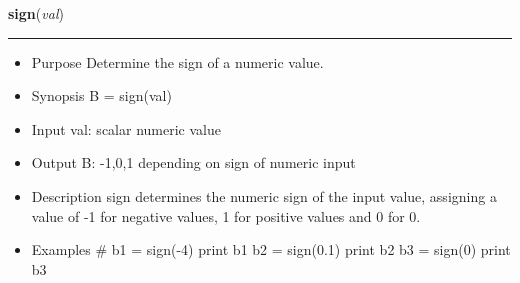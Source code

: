     \begin{boxedminipage}{\textwidth}

    \raggedright \textbf{sign}(\textit{val})

    \vspace{-1.5ex}

    \rule{\textwidth}{0.5\fboxrule}
    \begin{itemize}
    \setlength{\parskip}{0.6ex}
      \item Purpose Determine the sign of a numeric value.

      \item Synopsis B = sign(val)

      \item Input val: scalar numeric value

      \item Output B: -1,0,1 depending on sign of numeric input

      \item Description sign determines the numeric sign of the input value, 
        assigning a value of -1 for negative values, 1 for positive 
        values and 0 for 0.

      \item Examples \# b1 = sign(-4) print b1 b2 = sign(0.1) print b2 b3 = 
        sign(0) print b3

    \end{itemize}

    \vspace{1ex}

    \end{boxedminipage}

    \label{multireg:num_pymorph:uint16}
    \vspace{0.5ex}

